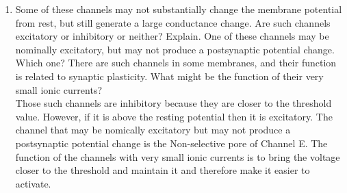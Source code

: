 \documentclass[11pt]{article}
\begin{document}
\begin{enumerate}[label=\arabic*.]
\begin{enumerate}[label=(\alph*)]
\item
Some of these channels may not substantially change the membrane potential from rest, but still generate a large conductance change. Are such channels excitatory or inhibitory or neither? Explain. One of these channels may be nominally excitatory, but may not produce a postsynaptic potential change. Which one? There are such channels in some membranes, and their function is related to synaptic plasticity. What might be the function of their very small ionic currents?
\vspace*{1\baselineskip}
\\
Those such channels are inhibitory because they are closer to the threshold value. However, if it is above the resting potential then it is excitatory. The channel that may be nomically excitatory but may not produce a postsynaptic potential change is the Non-selective pore of Channel E. The function of the channels with very small ionic currents is to bring the voltage closer to the threshold and maintain it and therefore make it easier to activate.
\end{enumerate}




\end{enumerate}
\end{document}
